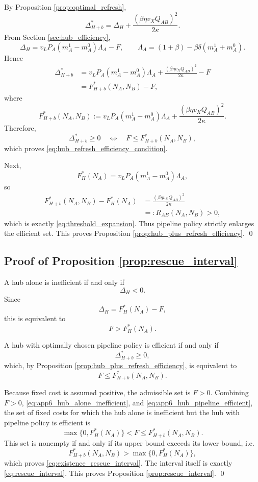 By Proposition \ref{prop:optimal_refresh},
\[
\Delta_{H+b}^*=
\Delta_H+\frac{(\beta\eta v_XQ_{AB})^2}{2\kappa}.
\]
From Section \ref{sec:hub_efficiency},
\[
\Delta_H
=
v_LP_A(m_A^1-m_A^0)\Lambda_A-F,
\qquad
\Lambda_A=(1+\beta)-\beta\delta(m_A^1+m_A^0).
\]
Hence
\begin{align}
\Delta_{H+b}^*
&=
v_LP_A(m_A^1-m_A^0)\Lambda_A
+
\frac{(\beta\eta v_XQ_{AB})^2}{2\kappa}
-F
\nonumber\\
&=
F_{H+b}^*(N_A,N_B)-F,
\label{eq:app6_DeltaHb_star_F}
\end{align}
where
\begin{equation}
F_{H+b}^*(N_A,N_B)
:=
v_LP_A(m_A^1-m_A^0)\Lambda_A
+
\frac{(\beta\eta v_XQ_{AB})^2}{2\kappa}.
\label{eq:app6_FHbstar}
\end{equation}
Therefore,
\[
\Delta_{H+b}^*\ge 0
\quad\Longleftrightarrow\quad
F\le F_{H+b}^*(N_A,N_B),
\]
which proves \eqref{eq:hub_refresh_efficiency_condition}.

Next,
\[
F_H^*(N_A)=v_LP_A(m_A^1-m_A^0)\Lambda_A,
\]
so
\begin{align}
F_{H+b}^*(N_A,N_B)-F_H^*(N_A)
&=
\frac{(\beta\eta v_XQ_{AB})^2}{2\kappa}
\nonumber\\
&=:
R_{AB}(N_A,N_B)
>0,
\label{eq:app6_threshold_gap}
\end{align}
which is exactly \eqref{eq:threshold_expansion}. Thus pipeline policy strictly enlarges the efficient set. This proves Proposition \ref{prop:hub_plus_refresh_efficiency}.
\qed

\subsection{Proof of Proposition \ref{prop:rescue_interval}}

A hub alone is inefficient if and only if
\[
\Delta_H<0.
\]
Since
\[
\Delta_H=F_H^*(N_A)-F,
\]
this is equivalent to
\begin{equation}
F>F_H^*(N_A).
\label{eq:app6_hub_alone_inefficient}
\end{equation}

A hub with optimally chosen pipeline policy is efficient if and only if
\[
\Delta_{H+b}^*\ge 0,
\]
which, by Proposition \ref{prop:hub_plus_refresh_efficiency}, is equivalent to
\begin{equation}
F\le F_{H+b}^*(N_A,N_B).
\label{eq:app6_hub_pipeline_efficient}
\end{equation}

Because fixed cost is assumed positive, the admissible set is $F>0$. Combining $F>0$, \eqref{eq:app6_hub_alone_inefficient}, and \eqref{eq:app6_hub_pipeline_efficient}, the set of fixed costs for which the hub alone is inefficient but the hub with pipeline policy is efficient is
\[
\max\{0,F_H^*(N_A)\}<F\le F_{H+b}^*(N_A,N_B).
\]
This set is nonempty if and only if its upper bound exceeds its lower bound, i.e.
\[
F_{H+b}^*(N_A,N_B)>\max\{0,F_H^*(N_A)\},
\]
which proves \eqref{eq:existence_rescue_interval}. The interval itself is exactly \eqref{eq:rescue_interval}. This proves Proposition \ref{prop:rescue_interval}.
\qed

